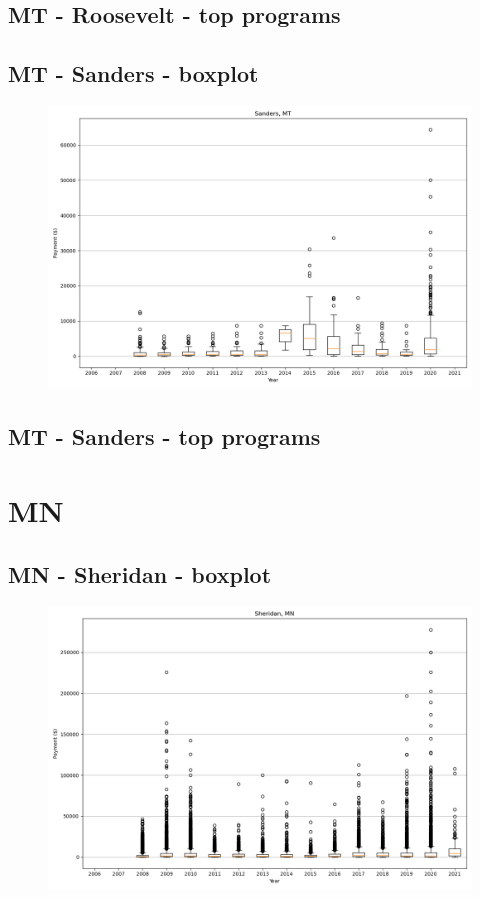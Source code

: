 \subsection*{MT - Roosevelt - top programs}

\newpage
\subsection*{MT - Sanders - boxplot}
\begin{figure}[h]
\centering
\includegraphics[width=7in]{../output/boxplots/counties/Sanders-MT_boxplot.png}
\end{figure}


\subsection*{MT - Sanders - top programs}

\newpage
\section*{MN}
\subsection*{MN - Sheridan - boxplot}
\begin{figure}[h]
\centering
\includegraphics[width=7in]{../output/boxplots/counties/Sheridan-MN_boxplot.png}
\end{figure}


